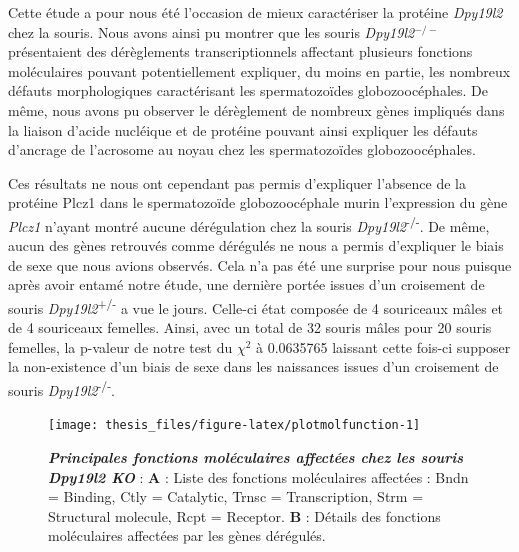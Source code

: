 \documentclass[12pt,a4paper,twoside]{ugathesis}
\theoremstyle{definition}
\theoremstyle{definition}
\theoremstyle{definition}
\theoremstyle{remark}
\begin{document}
Cette étude a pour nous été l'occasion de mieux caractériser la protéine
\emph{Dpy19l2} chez la souris. Nous avons ainsi pu montrer que les
souris \emph{Dpy19l2}\(^{-/-}\) présentaient des dérèglements
transcriptionnels affectant plusieurs fonctions moléculaires pouvant
potentiellement expliquer, du moins en partie, les nombreux défauts
morphologiques caractérisant les spermatozoïdes globozoocéphales. De
même, nous avons pu observer le dérèglement de nombreux gènes impliqués
dans la liaison d'acide nucléique et de protéine pouvant ainsi expliquer
les défauts d'ancrage de l'acrosome au noyau chez les spermatozoïdes
globozoocéphales.

Ces résultats ne nous ont cependant pas permis d'expliquer l'absence de
la protéine Plcz1 dans le spermatozoïde globozoocéphale murin
l'expression du gène \emph{Plcz1} n'ayant montré aucune dérégulation
chez la souris \emph{Dpy19l2}\textsuperscript{-/-}. De même, aucun des
gènes retrouvés comme dérégulés ne nous a permis d'expliquer le biais de
sexe que nous avions observés. Cela n'a pas été une surprise pour nous
puisque après avoir entamé notre étude, une dernière portée issues d'un
croisement de souris \emph{Dpy19l2}\textsuperscript{+/-} a vue le jours.
Celle-ci état composée de 4 souriceaux mâles et de 4 souriceaux
femelles. Ainsi, avec un total de 32 souris mâles pour 20 souris
femelles, la p-valeur de notre test du \(\chi^2\) à 0.0635765 laissant
cette fois-ci supposer la non-existence d'un biais de sexe dans les
naissances issues d'un croisement de souris
\emph{Dpy19l2}\textsuperscript{-/-}.

\newpage 

\begin{figure}

{\centering \texttt{[image: thesis\_files/figure-latex/plotmolfunction-1]} 

}

\caption[Principales fonctions moléculaires affectées
chez les souris \emph{Dpy19l2} KO\\]{\textbf{\emph{Principales fonctions moléculaires
affectées chez les souris \emph{Dpy19l2} KO}} : \textbf{A} : Liste des
fonctions moléculaires affectées : Bndn = Binding, Ctly = Catalytic,
Trnsc = Transcription, Strm = Structural molecule, Rcpt = Receptor.
\textbf{B} : Détails des fonctions moléculaires affectées par les gènes
dérégulés.}\label{fig:plotmolfunction}
\end{figure}
\end{document}

